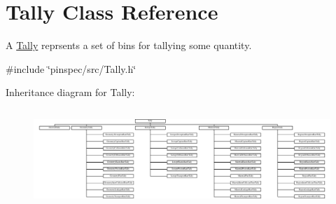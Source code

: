\hypertarget{classTally}{\section{Tally Class Reference}
\label{classTally}
}


A \hyperlink{classTally}{Tally} reprsents a set of bins for tallying some quantity.  




{\ttfamily \#include \char`\"{}pinspec/src/\-Tally.\-h\char`\"{}}

Inheritance diagram for Tally\-:\begin{figure}[H]
\begin{center}
\leavevmode
\includegraphics[height=3.733334cm]{classTally}
\end{center}
\end{figure}
